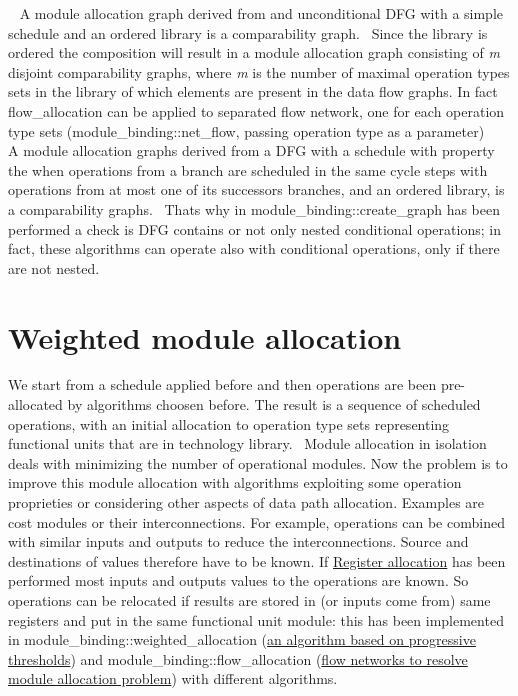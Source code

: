 ~\newline
 A module allocation graph derived from and unconditional D\+FG with a simple schedule and an ordered library is a comparability graph.~\newline
 Since the library is ordered the composition will result in a module allocation graph consisting of {\itshape m} disjoint comparability graphs, where {\itshape m} is the number of maximal operation types sets in the library of which elements are present in the data flow graphs. In fact flow\+\_\+allocation can be applied to separated flow network, one for each operation type sets (module\+\_\+binding\+::net\+\_\+flow, passing operation type as a parameter)~\newline
~\newline
 A module allocation graphs derived from a D\+FG with a schedule with property the when operations from a branch are scheduled in the same cycle steps with operations from at most one of its successors branches, and an ordered library, is a comparability graphs.~\newline
 That\textquotesingle{}s why in module\+\_\+binding\+::create\+\_\+graph has been performed a check is D\+FG contains or not only nested conditional operations; in fact, these algorithms can operate also with conditional operations, only if there are not nested.~\newline
~\newline
\hypertarget{src_HLS_module_binding_page_weighted_allocation}{}\section{Weighted module allocation}\label{src_HLS_module_binding_page_weighted_allocation}
We start from a schedule applied before and then operations are been pre-\/allocated by algorithms choosen before. The result is a sequence of scheduled operations, with an initial allocation to operation type sets representing functional units that are in technology library.~\newline
 Module allocation in isolation deals with minimizing the number of operational modules. Now the problem is to improve this module allocation with algorithms exploiting some operation proprieties or considering other aspects of data path allocation. Examples are cost modules or their interconnections. For example, operations can be combined with similar inputs and outputs to reduce the interconnections. Source and destinations of values therefore have to be known. If \hyperlink{src_HLS_registerAllocation_page}{Register allocation} has been performed most inputs and outputs values to the operations are known. So operations can be relocated if results are stored in (or inputs come from) same registers and put in the same functional unit module\+: this has been implemented in module\+\_\+binding\+::weighted\+\_\+allocation (\hyperlink{src_HLS_module_binding_page_threshold}{an algorithm based on progressive thresholds}) and module\+\_\+binding\+::flow\+\_\+allocation (\hyperlink{src_HLS_module_binding_page_flow_net}{flow networks to resolve module allocation problem}) with different algorithms.~\newline
